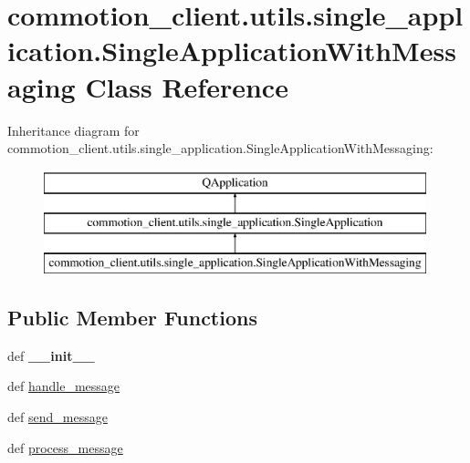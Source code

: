 \hypertarget{classcommotion__client_1_1utils_1_1single__application_1_1SingleApplicationWithMessaging}{\section{commotion\+\_\+client.\+utils.\+single\+\_\+application.\+Single\+Application\+With\+Messaging Class Reference}
\label{classcommotion__client_1_1utils_1_1single__application_1_1SingleApplicationWithMessaging}
}
Inheritance diagram for commotion\+\_\+client.\+utils.\+single\+\_\+application.\+Single\+Application\+With\+Messaging\+:\begin{figure}[H]
\begin{center}
\leavevmode
\includegraphics[height=3.000000cm]{classcommotion__client_1_1utils_1_1single__application_1_1SingleApplicationWithMessaging}
\end{center}
\end{figure}
\subsection*{Public Member Functions}
\begin{DoxyCompactItemize}
\item 
\hypertarget{classcommotion__client_1_1utils_1_1single__application_1_1SingleApplicationWithMessaging_a267f94646304f99b18a0ade20db51d80}{def {\bfseries \+\_\+\+\_\+init\+\_\+\+\_\+}}\label{classcommotion__client_1_1utils_1_1single__application_1_1SingleApplicationWithMessaging_a267f94646304f99b18a0ade20db51d80}

\item 
def \hyperlink{classcommotion__client_1_1utils_1_1single__application_1_1SingleApplicationWithMessaging_a1289d2bf53f8a3647dd9bce62bd877e6}{handle\+\_\+message}
\item 
def \hyperlink{classcommotion__client_1_1utils_1_1single__application_1_1SingleApplicationWithMessaging_a07475e0643ef2f92a0e990e7feefa4e3}{send\+\_\+message}
\item 
def \hyperlink{classcommotion__client_1_1utils_1_1single__application_1_1SingleApplicationWithMessaging_af0bf77fe13d6cd9e27d13927f4dcaae4}{process\+\_\+message}
\end{DoxyCompactItemize}
